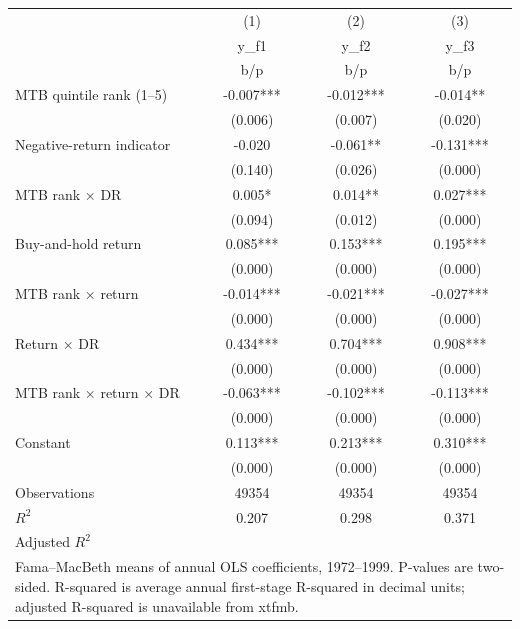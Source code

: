 {
\def\sym#1{\ifmmode^{#1}\else\(^{#1}\)\fi}
\begin{tabular}{l*{3}{c}}
\hline\hline
                    &\multicolumn{1}{c}{(1)}&\multicolumn{1}{c}{(2)}&\multicolumn{1}{c}{(3)}\\
                    &\multicolumn{1}{c}{y\_f1}&\multicolumn{1}{c}{y\_f2}&\multicolumn{1}{c}{y\_f3}\\
                    &         b/p   &         b/p   &         b/p   \\
\hline
MTB quintile rank (1–5)&      -0.007***&      -0.012***&      -0.014** \\
                    &     (0.006)   &     (0.007)   &     (0.020)   \\
Negative-return indicator&      -0.020   &      -0.061** &      -0.131***\\
                    &     (0.140)   &     (0.026)   &     (0.000)   \\
MTB rank × DR       &       0.005*  &       0.014** &       0.027***\\
                    &     (0.094)   &     (0.012)   &     (0.000)   \\
Buy-and-hold return &       0.085***&       0.153***&       0.195***\\
                    &     (0.000)   &     (0.000)   &     (0.000)   \\
MTB rank × return   &      -0.014***&      -0.021***&      -0.027***\\
                    &     (0.000)   &     (0.000)   &     (0.000)   \\
Return × DR         &       0.434***&       0.704***&       0.908***\\
                    &     (0.000)   &     (0.000)   &     (0.000)   \\
MTB rank × return × DR&      -0.063***&      -0.102***&      -0.113***\\
                    &     (0.000)   &     (0.000)   &     (0.000)   \\
Constant            &       0.113***&       0.213***&       0.310***\\
                    &     (0.000)   &     (0.000)   &     (0.000)   \\
\hline
Observations        &       49354   &       49354   &       49354   \\
\(R^{2}\)           &       0.207   &       0.298   &       0.371   \\
Adjusted \(R^{2}\)  &               &               &               \\
\hline\hline
\multicolumn{4}{l}{\footnotesize Fama–MacBeth means of annual OLS coefficients, 1972–1999. P-values are two-sided. R-squared is average annual first-stage R-squared in decimal units; adjusted R-squared is unavailable from xtfmb.}\\
\end{tabular}
}
